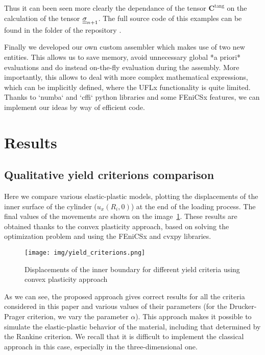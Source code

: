 \documentclass[12pt]{article}
\newcommand{\todolink}{\todo[fancyline, size=\scriptsize]{TOCITE}}
\begin{document}
Thus it can been seen more clearly the dependance of the tensor $\mathbf{C}^\text{tang}$ on the calculation of the tensor $\underline{\underline{\sigma}}_{n+1}$. The full source code of this examples can be found in the  folder of the repository \todolink .

Finally we developed our own custom assembler which makes use of two new entities. This allows us to save memory, avoid unnecessary global *a priori* evaluations and do instead on-the-fly evaluation during the assembly. More importantly, this allows to deal with more complex mathematical expressions, which can be implicitly defined, where the UFLx functionality is quite limited. Thanks to `numba` and `cffi` python libraries and some FEniCSx features, we can implement our ideas by way of efficient code. 

\newpage
\section{Results}

\subsection{Qualitative yield criterions comparison}

Here we compare various elastic-plastic models, plotting the displacements of the inner surface of the cylinder ($u_x(R_i, 0)$) at the end of the loading process. The final values of the movements are shown on the image~\ref{fig:yield_criteria}. These results are obtained thanks to the convex plasticity approach, based on solving the optimization problem and using the FEniCSx and cvxpy libraries.
\begin{figure}[H]
    \center
    \texttt{[image: img/yield\_criterions.png]}
    \caption{Displacements of the inner boundary for different yield criteria using convex plasticity approach}
    \label{fig:yield_criteria}
\end{figure}
As we can see, the proposed approach gives correct results for all the criteria considered in this paper and various values of their parameters (for the Drucker-Prager criterion, we vary the parameter $\alpha$). This approach makes it possible to simulate the elastic-plastic behavior of the material, including that determined by the Rankine criterion. We recall that it is difficult to implement the classical approach in this case, especially in the three-dimensional one.
\end{document}
